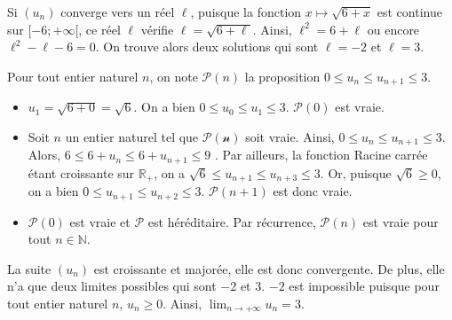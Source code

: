 \documentclass[11pt,fleqn, openany]{book} %
\begin{document}
\begin{solution}Si $(u_n)$ converge vers un réel $\ell$, puisque la fonction $x\mapsto \sqrt{6+x}$ est continue sur $[-6;+\infty[$, ce réel $\ell$ vérifie $\ell=\sqrt{6+\ell}$. Ainsi, $\ell^2=6+\ell$ ou encore $\ell^2-\ell-6=0$. On trouve alors deux solutions qui sont $\ell=-2$ et $\ell=3$.

Pour tout entier naturel $n$, on note $\mathcal{P}(n)$ la proposition $0\leqslant u_n \leqslant u_{n+1} \leqslant 3$.
\begin{itemize}
\item $u_1= \sqrt{6+0}=\sqrt{6}$. On a bien $0 \leqslant u_0 \leqslant u_1 \leqslant 3$. $\mathcal{P}(0)$ est vraie.
\item Soit $n$ un entier naturel tel que $\mathcal{P(n)}$ soit vraie. Ainsi, $0\leqslant u_n \leqslant u_{n+1} \leqslant 3$. \\ Alors, $6\leqslant 6+u_n \leqslant 6+u_{n+1} \leqslant 9$ . Par ailleurs,  la fonction Racine carrée étant croissante sur $\mathbb{R}_+$, on a $\sqrt{6} \leqslant u_{n+1} \leqslant u_{n+3} \leqslant 3$. Or, puisque $\sqrt{6} \geqslant 0$, on a bien $0\leqslant u_{n+1} \leqslant u_{n+2} \leqslant 3$. $\mathcal{P}(n+1)$ est donc vraie.
\item  $\mathcal{P}(0)$ est vraie et $\mathcal{P}$ est héréditaire. Par récurrence, $\mathcal{P}(n)$ est vraie pour tout $n\in\mathbb{N}$.
\end{itemize}

La suite $(u_n)$ est croissante et majorée, elle est donc convergente. De plus, elle n'a que deux limites possibles qui sont $-2$ et $3$. $-2$ est impossible puisque pour tout entier naturel $n$, $u_n \geqslant 0$. Ainsi, $\displaystyle \lim_{n \to + \infty }u_n=3$.\end{solution}
\end{document}
